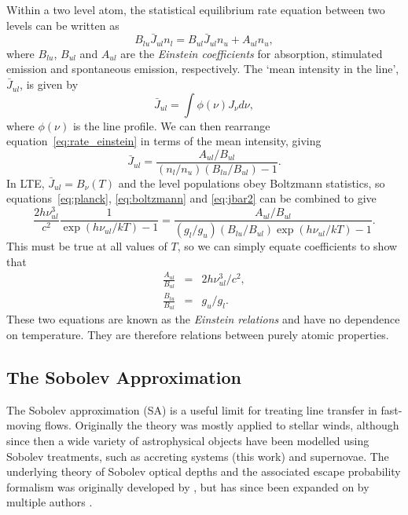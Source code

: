 Within a two level atom, the statistical equilibrium 
rate equation between two levels can be written as
\begin{equation}
B_{lu} \bar{J}_{ul} n_l = B_{ul} \bar{J}_{ul} n_u + A_{ul} n_u,
\label{eq:rate_einstein}
\end{equation}
where $B_{lu}$, $B_{ul}$ and $A_{ul}$ are the {\em Einstein coefficients}
for absorption, stimulated emission and spontaneous emission, respectively.
The `mean intensity in the line', $\bar{J}_{ul}$, is given by
\begin{equation}
\bar{J}_{ul} = \int \phi(\nu) J_\nu d\nu,
\label{eq:jbar}
\end{equation}
where $\phi(\nu)$ is the line profile.
We can then rearrange equation~\ref{eq:rate_einstein} in terms of 
the mean intensity, giving
\begin{equation}
\bar{J}_{ul} = \frac{A_{ul} / B_{ul}}{(n_l/n_u)(B_{lu}/B_{ul}) - 1}.
\label{eq:jbar2}
\end{equation}
In LTE, $\bar{J}_{ul} = B_\nu (T)$ and the level populations obey Boltzmann statistics, 
so equations~\ref{eq:planck}, \ref{eq:boltzmann}
and \ref{eq:jbar2}  can be combined to give
\begin{equation}
\frac{2 h \nu_{ul}^3}{c^2} \frac{1}{\exp(h\nu_{ul} / kT) - 1} =
\frac{A_{ul}/B_{ul}}{(g_l/g_u)(B_{lu}/B_{ul}) \exp(h\nu_{ul} / kT) - 1}.
\end{equation}
This must be true at all values of $T$, so we can 
simply equate coefficients to show that
\begin{eqnarray}
\frac{A_{ul}}{B_{ul}} &=& 2 h \nu_{ul}^3/c^2, \\  
\frac{B_{lu}}{B_{ul}} &=& g_u/g_l.  
 \label{eq:einstein_relations}     
\end{eqnarray}
These two equations are known as the {\em Einstein relations} and have 
no dependence on temperature. They are therefore relations between 
purely atomic properties.

\subsection{The Sobolev Approximation}
\label{sec:sobolev}
The Sobolev approximation (SA) is a useful limit 
for treating line transfer in fast-moving flows. Originally 
the theory was mostly applied to stellar winds, although since then
a wide variety of astrophysical objects have been modelled using Sobolev treatments,
such as accreting systems (this work) and supernovae. The underlying theory
of Sobolev optical depths and the associated escape probability formalism
was originally developed by \cite{sobolev1957,sobolev1960}, but has since
been expanded on by multiple authors 
\citep[e.g.][]{rybicki1970,rybickihummer1978,hubeny2001rt}.

